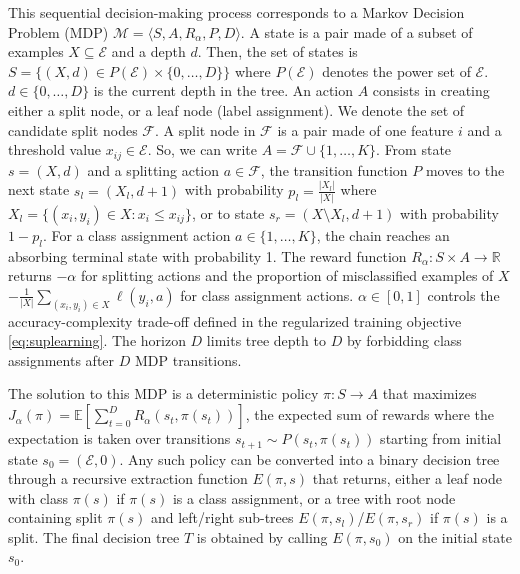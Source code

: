 This sequential decision-making process corresponds to a Markov Decision Problem (MDP) \cite{puterman} $\mathcal{M}=\langle S, A, R_{\alpha}, P, D \rangle$.
A state is a pair made of a subset of examples $X\subseteq\mathcal E$ and a depth $d$. Then, the set of states is $S = \{ (X, d) \in P(\mathcal{E}) \times \{0, \ldots, D\} \}$ where $P(\mathcal{E})$ denotes the power set of $\mathcal{E}$. $d \in \{0,\ldots,D\}$ is the current depth in the tree.
An action $A$ consists in creating either a split node, or a leaf node (label assignment). We denote the set of candidate split nodes 
$ {\mathcal F} $. A split node in $\mathcal F$ is a pair made of one feature $i$ and a threshold value $x_{ij}\in \mathcal{E}$.
So, we can write $A = {\mathcal{F} \cup \{ 1, \ldots, K \}}$.
From state $s=(X,d)$ and a splitting action $a \in {\mathcal F}$, the transition function $P$ moves to the next state $s_l = (X_l, d+1)$ with probability $p_l = \frac{|X_l|}{|X|}$ where $X_l = \{(x_i, y_i) \in X: x_i \leq x_{ij}\}$, or to state $s_r = (X \setminus X_l, d+1)$ with probability $1-p_l$. For a class assignment action $a \in \{1,\ldots,K\}$, the chain reaches an absorbing terminal state with probability 1. 
The reward function $R_{\alpha}: S \times A \rightarrow \mathbb{R}$ returns $-\alpha$ for splitting actions and the proportion of misclassified examples of $X$ $-\frac{1}{|X|}\sum_{(x_i,y_i) \in X} \ell(y_i, a)$ for class assignment actions. $\alpha \in [0,1]$ controls the accuracy-complexity trade-off defined in the regularized training objective \ref{eq:suplearning}. 
The horizon $D$ limits tree depth to $D$ by forbidding class assignments after $D$ MDP transitions.

The solution to this MDP is a deterministic policy $\pi: S \rightarrow A$ that maximizes $J_{\alpha}(\pi) ={\mathbb{E}}\left[\sum_{t = 0}^D R_{\alpha}(s_t, \pi(s_t))\right]$, the expected sum of rewards where the expectation is taken over transitions $s_{t+1}\sim P(s_t, \pi(s_t))$ starting from initial state $s_0 = (\mathcal{E}, 0)$. 
Any such policy can be converted into a binary decision tree through a recursive extraction function $E(\pi, s)$ that returns, either a leaf node with class $\pi(s)$ if $\pi(s)$ is a class assignment, or a tree with root node containing split $\pi(s)$ and left/right sub-trees $E(\pi, s_l)$/$E(\pi, s_r)$ if $\pi(s)$ is a split. The final decision tree $T$ is obtained by calling $E(\pi, s_0)$ on the initial state $s_0$. 

